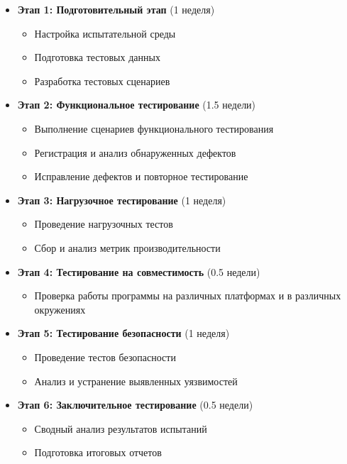 \documentclass{article}
\begin{document}
    \begin{itemize}
        \item \textbf{Этап 1: Подготовительный этап} (1 неделя)
        \begin{itemize}
            \item Настройка испытательной среды
            \item Подготовка тестовых данных
            \item Разработка тестовых сценариев
        \end{itemize}
        \item \textbf{Этап 2: Функциональное тестирование} (1.5 недели)
        \begin{itemize}
            \item Выполнение сценариев функционального тестирования
            \item Регистрация и анализ обнаруженных дефектов
            \item Исправление дефектов и повторное тестирование
        \end{itemize}
        \item \textbf{Этап 3: Нагрузочное тестирование} (1 неделя)
        \begin{itemize}
            \item Проведение нагрузочных тестов
            \item Сбор и анализ метрик производительности
        \end{itemize}
        \item \textbf{Этап 4: Тестирование на совместимость} (0.5 недели)
        \begin{itemize}
            \item Проверка работы программы на различных платформах и в различных окружениях
        \end{itemize}
        \item \textbf{Этап 5: Тестирование безопасности} (1 неделя)
        \begin{itemize}
            \item Проведение тестов безопасности
            \item Анализ и устранение выявленных уязвимостей
        \end{itemize}
        \item \textbf{Этап 6: Заключительное тестирование} (0.5 недели)
        \begin{itemize}
            \item Сводный анализ результатов испытаний
            \item Подготовка итоговых отчетов
        \end{itemize}
    \end{itemize}
\end{document}
